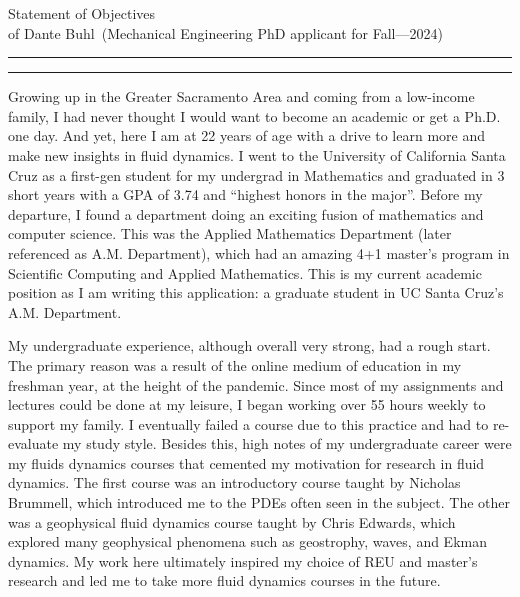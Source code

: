 \documentclass{article}
\newcommand{\soptitle}{Statement of Objectives}
\newcommand{\yourname}{Dante Buhl}
\begin{document}
\begin{center}\LARGE\soptitle\\
\large of \yourname\ (Mechanical Engineering PhD applicant for Fall---2024)
\end{center}

\hrule
\vspace{1pt}
\hrule height 1pt

\bigskip

\large
Growing up in the Greater Sacramento Area and coming from a low-income family, I had never thought I would want to become an academic or get a Ph.D. one day. And yet, here I am at 22 years of age with a drive to learn more and make new insights in fluid dynamics. I went to the University of California Santa Cruz as a first-gen student for my undergrad in Mathematics and graduated in 3 short years with a GPA of 3.74 and ``highest honors in the major''. Before my departure, I found a department doing an exciting fusion of mathematics and computer science. This was the Applied Mathematics Department (later referenced as A.M. Department), which had an amazing 4+1 master's program in Scientific Computing and Applied Mathematics. This is my current academic position as I am writing this application: a graduate student in UC Santa Cruz's A.M. Department. 

My undergraduate experience, although overall very strong, had a rough start. The primary reason was a result of the online medium of education in my freshman year, at the height of the pandemic. Since most of my assignments and lectures could be done at my leisure, I began working over 55 hours weekly to support my family. I eventually failed a course due to this practice and had to re-evaluate my study style. Besides this, high notes of my undergraduate career were my fluids dynamics courses that cemented my motivation for research in fluid dynamics. The first course was an introductory course taught by Nicholas Brummell, which introduced me to the PDEs often seen in the subject. The other was a geophysical fluid dynamics course taught by Chris Edwards, which explored many geophysical phenomena such as geostrophy, waves, and Ekman dynamics. My work here ultimately inspired my choice of REU and master's research and led me to take more fluid dynamics courses in the future. 
\end{document}
